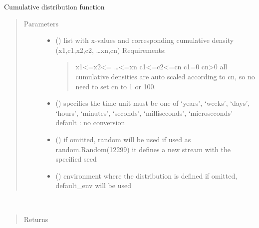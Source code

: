 \documentclass[letterpaper,10pt,english]{sphinxmanual}
\begin{document}
\begin{fulllineitems}
\label{\detokenize{Reference:salabim.Cdf}}
Cumulative distribution function
\begin{quote}\begin{description}
\item[{Parameters}] \leavevmode\begin{itemize}
\item {} 
 () \textendash{} 
list with x-values and corresponding cumulative density
(x1,c1,x2,c2, …xn,cn) 
Requirements:
\begin{quote}

x1\textless{}=x2\textless{}= …\textless{}=xn 
c1\textless{}=c2\textless{}=cn 
c1=0 
cn\textgreater{}0 
all cumulative densities are auto scaled according to cn,
so no need to set cn to 1 or 100.
\end{quote}


\item {} 
 () \textendash{} specifies the time unit 
must be one of ‘years’, ‘weeks’, ‘days’, ‘hours’, ‘minutes’, ‘seconds’, ‘milliseconds’, ‘microseconds’ 
default : no conversion 

\item {} 
 () \textendash{} if omitted, random will be used 
if used as random.Random(12299)
it defines a new stream with the specified seed

\item {} 
 ({\hyperref[\detokenize{Reference:salabim.Environment}]{}}) \textendash{} environment where the distribution is defined 
if omitted, default\_env will be used

\end{itemize}

\end{description}\end{quote}

\begin{fulllineitems}
\label{\detokenize{Reference:salabim.Cdf.mean}}~\begin{quote}\begin{description}
\item[{Returns}] \leavevmode
{}


\end{description}
\end{quote}
\end{fulllineitems}
\end{fulllineitems}
\end{document}
